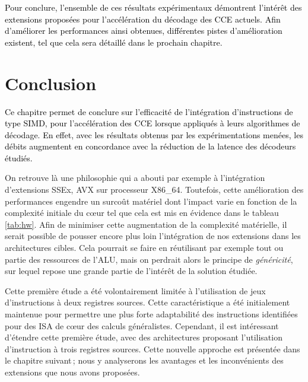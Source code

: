 \documentclass[../main.tex]{subfiles}
\begin{document}
\textcolor{black}{Pour conclure, l'ensemble de ces résultats expérimentaux démontrent l'intérêt des extensions proposées pour l'accélération du décodage des CCE actuels. 
Afin d'améliorer les performances ainsi obtenues, différentes pistes d'amélioration existent, tel que cela sera détaillé dans le prochain chapitre.}



%
%
%
%
\section{Conclusion}
%
%
%
%
\textcolor{black}{Ce chapitre permet de conclure sur l'efficacité de l'intégration d'instructions de type SIMD, pour l'accélération des CCE lorsque appliqués à leurs algorithmes de décodage. 
En effet, avec les résultats obtenus par les expérimentations menées, les débits augmentent en concordance avec la réduction de la latence des décodeurs étudiés.}

On retrouve là une philosophie qui a abouti par exemple à l'intégration d'extensions SSEx, AVX sur processeur X86\_64. 
Toutefois, cette amélioration des performances engendre un surcoût matériel dont l'impact varie en fonction de la complexité initiale du cœur tel que cela est mis en évidence dans le tableau \ref{tab:hw}. 
Afin de minimiser cette augmentation de la complexité matérielle, il serait possible de pousser encore plus loin l'intégration de nos extensions dans les architectures cibles. 
Cela pourrait se faire en réutilisant par exemple tout ou partie des ressources de l'ALU, mais on perdrait alors le principe de \textit{généricité}, sur lequel repose une grande partie de l'intérêt de la solution étudiée.

Cette première étude a été volontairement limitée à l'utilisation de jeux d'instructions à deux registres sources. 
Cette caractéristique a été initialement maintenue pour permettre une plus forte adaptabilité des instructions identifiées pour des ISA de cœur des calculs généralistes. 
Cependant, il est intéressant d'étendre cette première étude, avec des architectures proposant l'utilisation d'instruction à trois registres sources. 
Cette nouvelle approche est présentée dans le chapitre suivant ; nous y analyserons les avantages et les inconvénients des extensions que nous avons proposées.
\end{document}
